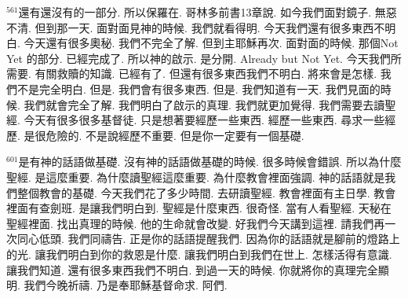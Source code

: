 \documentclass{book}
\begin{document}
$^{561}$還有還沒有的一部分.
所以保羅在.
哥林多前書13章說.
如今我們面對鏡子.
無惡不清.
但到那一天.
面對面見神的時候.
我們就看得明.
今天我們還有很多東西不明白.
今天還有很多奧秘.
我們不完全了解.
但到主耶穌再次.
面對面的時候.
那個Not Yet 的部分.
已經完成了.
所以神的啟示.
是分開.
Already but Not Yet.
今天我們所需要.
有關救贖的知識.
已經有了.
但還有很多東西我們不明白.
將來會是怎樣.
我們不是完全明白.
但是.
我們會有很多東西.
但是.
我們知道有一天.
我們見面的時候.
我們就會完全了解.
我們明白了啟示的真理.
我們就更加覺得.
我們需要去讀聖經.
今天有很多很多基督徒.
只是想著要經歷一些東西.
經歷一些東西.
尋求一些經歷.
是很危險的.
不是說經歷不重要.
但是你一定要有一個基礎.

$^{601}$是有神的話語做基礎.
沒有神的話語做基礎的時候.
很多時候會錯誤.
所以為什麼聖經.
是這麼重要.
為什麼讀聖經這麼重要.
為什麼教會裡面強調.
神的話語就是我們整個教會的基礎.
今天我們花了多少時間.
去研讀聖經.
教會裡面有主日學.
教會裡面有查劍班.
是讓我們明白到.
聖經是什麼東西.
很奇怪.
當有人看聖經.
天秘在聖經裡面.
找出真理的時候.
他的生命就會改變.
好我們今天講到這裡.
請我們再一次同心低頭.
我們同禱告.
正是你的話語提醒我們.
因為你的話語就是腳前的燈路上的光.
讓我們明白到你的救恩是什麼.
讓我們明白到我們在世上.
怎樣活得有意識.
讓我們知道.
還有很多東西我們不明白.
到過一天的時候.
你就將你的真理完全顯明.
我們今晚祈禱.
乃是奉耶穌基督命求.
阿們.
\newpage
\end{document}
